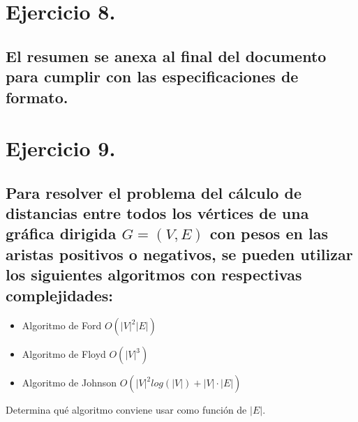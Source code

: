 \documentclass[12pt]{article}
\begin{document}
\section{Ejercicio 8.}
\subsection{El resumen se anexa al final del documento para cumplir con las especificaciones de formato.}
\pagebreak
\section{Ejercicio 9.}
\subsection{Para resolver el problema del cálculo de distancias entre todos los vértices de una gráfica dirigida $G=(V,E)$ con pesos en las aristas positivos o negativos, se pueden utilizar los siguientes algoritmos con respectivas complejidades:}
 \begin{itemize}
\item Algoritmo de Ford $O(|V|^{2}|E|)$
\item Algoritmo de Floyd $O(|V|^{3})$
\item Algoritmo de Johnson $O(|V|^{2}log(|V|) + |V| \cdot |E|)$ 
 \end{itemize}
Determina qué algoritmo conviene usar como función de $|E|$.
\end{document}
